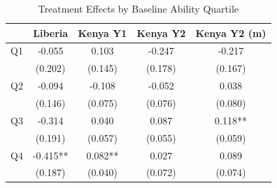 \begin{table}[htbp]
\centering
\small
\caption{Treatment Effects by Baseline Ability Quartile}
\label{tab:quartiles}
\begin{tabular}{l*{4}{c}}
\toprule
 & Liberia & Kenya Y1 & Kenya Y2 & Kenya Y2 (m) \\
\midrule
Q1 & -0.055 & 0.103 & -0.247 & -0.217 \\
 & (0.202) & (0.145) & (0.178) & (0.167) \\
\addlinespace
Q2 & -0.094 & -0.108 & -0.052 & 0.038 \\
 & (0.146) & (0.075) & (0.076) & (0.080) \\
\addlinespace
Q3 & -0.314 & 0.040 & 0.087 & 0.118** \\
 & (0.191) & (0.057) & (0.055) & (0.059) \\
\addlinespace
Q4 & -0.415** & 0.082** & 0.027 & 0.089 \\
 & (0.187) & (0.040) & (0.072) & (0.074) \\
\bottomrule
\end{tabular}
\par\smallskip{}
\end{table}